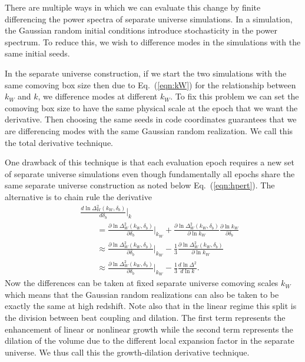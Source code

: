 \documentclass[prd,twocolumn,amsmath,amssymb,floatfix,superscriptaddress]{revtex4-1}
\begin{document}
There are multiple ways in which we can evaluate this change by finite differencing
the power spectra of separate universe simulations.    In a simulation, the Gaussian random
initial conditions introduce stochasticity in the power spectrum.  To reduce this, we wish
to difference modes in the simulations with the same initial seeds.  

In the separate universe construction, if we start the
two simulations with the same comoving box size then due to Eq.~(\ref{eqn:kW}) for the
 relationship 
between $k_W$ and $k$, we difference modes at different $k_W$.   To fix this problem
we can set the comoving box size to have the same physical scale at the epoch that
we want the derivative.   Then choosing the same seeds in code coordinates guarantees
that we are differencing modes with the same Gaussian random realization.
We call this  the total derivative technique.

One drawback of this technique is that each evaluation epoch requires a new set of
separate universe simulations even though fundamentally all epochs share the same separate
universe construction as noted below Eq.~(\ref{eqn:hpert}).   The alternative is to chain rule the derivative
\begin{eqnarray}
\label{eqn:nodilation}
&&\frac {d \ln \Delta_W^2(k_W,\delta_b)}{d\delta_b}\Big|_k\\
 &&\qquad= \frac {\partial \ln \Delta_W^2(k_W,\delta_b)}{\partial \delta_b}\Big|_{k_W} +  \frac {\partial \ln \Delta_W^2(k_W,\delta_b)}{\partial \ln k_W} \frac{\partial \ln k_W}{\partial\delta_b} 
\nonumber\\
&&\qquad \approx  \frac {\partial \ln \Delta_W^2(k_W,\delta_b)}{\partial \delta_b}\Big|_{k_W} -\frac{1}{3}  \frac {\partial \ln \Delta_W^2(k_W,\delta_b)}{\partial \ln k_W} \nonumber\\
&&\qquad \approx\frac {\partial \ln \Delta_W^2(k_W,\delta_b)}{\partial \delta_b}\Big|_{k_W} -\frac{1}{3}  \frac {d \ln \Delta^2}{d \ln k}. \nonumber
\end{eqnarray}
Now the differences can be taken at fixed separate universe comoving scales $k_W$ which means that the Gaussian random realizations can also be taken to be exactly the same at
high redshift.
Note also that in the linear regime this split is the division between  beat coupling
and dilation.  The first term represents the enhancement of linear or nonlinear growth
while the second term represents the dilation of the volume due to the different local expansion factor in the separate universe.    We thus call this the growth-dilation
derivative technique.
\end{document}

